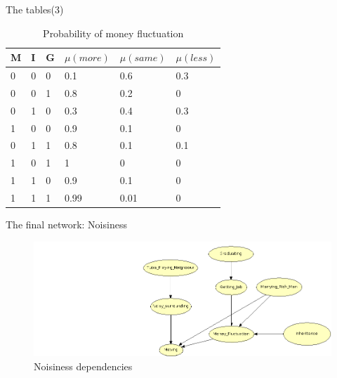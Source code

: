 \documentclass{beamer}
\begin{document}
\begin{frame}{The tables(3)}
\begin{centering}
\begin{table}
\begin{tabular}{|lll|lll|}
  \hline
  M & I & G & $\mu(more)$ & $\mu(same)$  & $\mu(less)$  \\ \hline
  0 & 0 & 0 &   0.1 & 0.6 & 0.3 \\
  0 & 0 & 1  &  0.8    & 0.2 & 0       \\ 
  0 & 1 & 0  &  0.3    & 0.4 & 0.3     \\
  1 & 0 & 0  &  0.9    & 0.1 & 0     \\                     
  0 & 1 & 1  &  0.8    & 0.1 & 0.1\\       
  1 & 0 & 1  &  1        & 0 & 0\\   
  1 & 1 & 0  &  0.9    & 0.1 & 0\\         
  1 & 1 & 1  &  0.99   & 0.01 & 0 \\
  \hline
\end{tabular}
\caption{Probability of money fluctuation}
\end{table}
\end{centering}
\end{frame}


\begin{frame}{The final network: Noisiness}
\begin{figure}[h!]
  \centering
    \includegraphics[width=1.1\textwidth]{network2.png}
  \caption{Noisiness dependencies}
\end{figure}
\end{frame}
\end{document}
